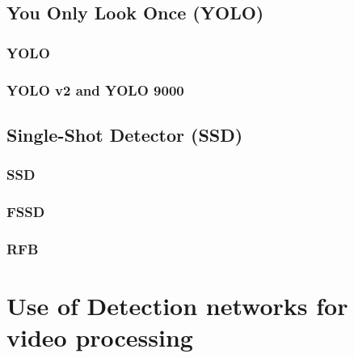 \subsection*{You Only Look Once (YOLO)}
\subsubsection{YOLO}
\label{sec:yolo}
\subsubsection{YOLO v2 and YOLO 9000}

\subsection*{Single-Shot Detector (SSD)}
\label{sec:ssd}
\subsubsection{SSD}

\subsubsection{FSSD}
\subsubsection{RFB}


\section{Use of Detection networks for video processing}






